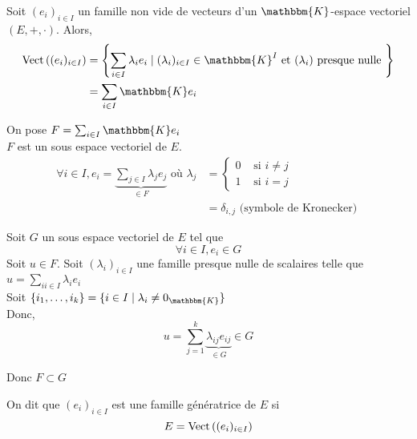 \begin{prop}
	Soit $(e_i)_{i\in I}$ un famille non vide de vecteurs d'un $\mathbbm{K}$-espace vectoriel $(E,+,\cdot)$. Alors,
	\begin{align*}
		\Vect\left( (e_i)_{i \in I} \right)
		&= \left\{ \sum_{i \in I} \lambda_i e_i  \mid (\lambda_i)_{i \in I} \in \mathbbm{K}^I \text{ et } (\lambda_i) \text{ presque nulle } \right\} \\
		&= \sum_{i \in I} \mathbbm{K}e_i \\
	\end{align*}
\end{prop}

\begin{prv}
	On pose $F = \sum_{i \in I}\mathbbm{K}e_i$\\
	$F$ est un sous espace vectoriel de $E$.\\
	\begin{align*}
		\forall i \in I, e_i = \underbrace{\sum_{j \in I} \lambda_j e_j}_{\in F} \text{ où }
		\lambda_j &= \begin{cases}
			0 &\text{ si } i \neq j\\
			1 &\text{ si } i = j
		\end{cases}\\
		&= \delta_{i,j} \text{ (symbole de Kronecker) }
	\end{align*}

	Soit $G$ un sous espace vectoriel de $E$ tel que \[
		\forall i \in I, e_i \in G
	\] Soit $u \in F$.
	Soit $(\lambda_i)_{i\in I}$ une famille presque nulle de scalaires telle que $ u = \sum_{ii \in I} \lambda_i e_i$\\
	Soit $\{i_1,\ldots,i_k\} = \{i \in I  \mid  \lambda_i \neq 0_\mathbbm{K}\}  $\\
	Donc, \[
		u = \sum_{j = 1}^k \underbrace{\lambda_{ij}e_{ij}}_{\in G} \in G
	\] 

	Donc $F \subset G$
\end{prv}

\begin{defn}
	On dit que $(e_i)_{i\in I}$ est une famille génératrice de $E$ si \[
		E = \operatorname{Vect}\left( (e_i)_{i \in I} \right) 
	\]
\end{defn}

\newcommand{\bx}[1]{\fbox{$#1$}}

